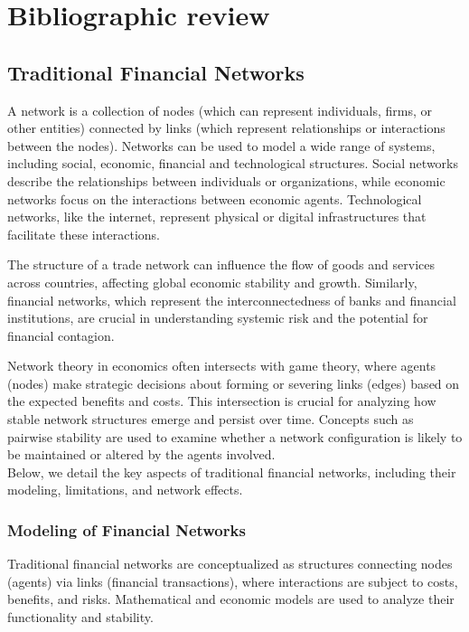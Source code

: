 \chapter{Bibliographic review}
\label{capreview}
\section{Traditional Financial Networks}
A network is a collection of nodes (which can represent individuals, firms, or other entities) connected by links (which represent relationships or interactions between the nodes). Networks can be used to model a wide range of systems, including social, economic, financial and technological structures. Social networks describe the relationships between individuals or organizations, while economic networks focus on the interactions between economic agents. Technological networks, like the internet, represent physical or digital infrastructures that facilitate these interactions. \cite{bich_existence_2020}

The structure of a trade network can influence the flow of goods and services across countries, affecting global economic stability and growth. Similarly, financial networks, which represent the interconnectedness of banks and financial institutions, are crucial in understanding systemic risk and the potential for financial contagion.


Network theory in economics often intersects with game theory, where agents (nodes) make strategic decisions about forming or severing links (edges) based on the expected benefits and costs. This intersection is crucial for analyzing how stable network structures emerge and persist over time. Concepts such as pairwise stability are used to examine whether a network configuration is likely to be maintained or altered by the agents involved. \cite{bich_perfect_2023} \\

Below, we detail the key aspects of traditional financial networks, including their modeling, limitations, and network effects.

\subsection{Modeling of Financial Networks}

Traditional financial networks are conceptualized as structures connecting nodes (agents) via links (financial transactions), where interactions are subject to costs, benefits, and risks. Mathematical and economic models are used to analyze their functionality and stability.

